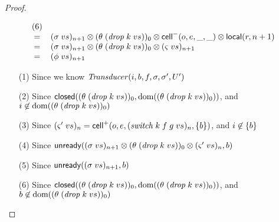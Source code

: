 \begin{proof}
\begin{enumerate}
\begin{displaymath}
\begin{array}{lcll}
        & (6) \\ 
        & = & (\sigma\;vs)_{n+1} \otimes (\theta\;(\mathit{drop}\;k\;vs))_0 \otimes \mathsf{cell}^{-}({o}, {e}, {\_}, {\_}) \otimes \mathsf{local}({r}, {n+1})
        & \\ 
        & = & (\sigma\;vs)_{n+1} \otimes (\theta\;(\mathit{drop}\;k\;vs))_0 \otimes (\varsigma\;vs)_{n+1} 
        & \\ 
        & = & (\phi\;vs)_{n+1}
        \end{array}
  \end{displaymath}
  \begin{itemize}
      \item[(1)] Since we know $\mathit{Transducer}(i, b, f, \sigma, \sigma', U')$ 
      \item[(2)] Since $\mathsf{closed}({(\theta\;(\mathit{drop}\;k\;vs))_0}, {\mbox{dom}({(\theta\;(\mathit{drop}\;k\;vs))_0})})$, and \\ $i \not\in \mbox{dom}({(\theta\;(\mathit{drop}\;k\;vs))_0})$
      \item[(3)] Since $(\varsigma'\;vs)_n = \mathsf{cell}^{+}({o}, {e}, {(\mathit{switch}\;k\;f\;g\;vs)_n}, {\{{b}\}})$, and $i \not\in \{{b}\}$
      \item[(4)] Since $\mathsf{unready}({(\sigma\;vs)_{n+1} \otimes (\theta\;(\mathit{drop}\;k\;vs))_0 \otimes (\varsigma'\;vs)_n}, {b})$ 
      \item[(5)] Since $\mathsf{unready}({(\sigma\;vs)_{n+1}}, {b})$ 
      \item[(6)] Since $\mathsf{closed}({(\theta\;(\mathit{drop}\;k\;vs))_0}, {\mbox{dom}({(\theta\;(\mathit{drop}\;k\;vs))_0})})$, and \\ $b \not\in \mbox{dom}({(\theta\;(\mathit{drop}\;k\;vs))_0})$
  \end{itemize}


\end{enumerate}
\end{proof}
